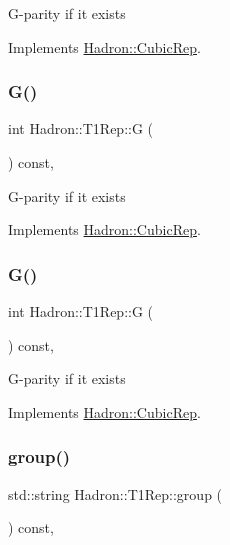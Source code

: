 G-\/parity if it exists 

Implements \mbox{\hyperlink{structHadron_1_1CubicRep_a52104e43266d1614c00bbd1c3b395458}{Hadron\+::\+Cubic\+Rep}}.

\mbox{\label{structHadron_1_1T1Rep_a824c17669ccaf2513c03a3b41a25108e}} 
\subsubsection{\texorpdfstring{G()}{G()}\hspace{0.1cm}{\footnotesize\ttfamily [2/3]}}
{\footnotesize\ttfamily int Hadron\+::\+T1\+Rep\+::G (\begin{DoxyParamCaption}{ }\end{DoxyParamCaption}) const\hspace{0.3cm}{\ttfamily [inline]}, {\ttfamily [virtual]}}

G-\/parity if it exists 

Implements \mbox{\hyperlink{structHadron_1_1CubicRep_a52104e43266d1614c00bbd1c3b395458}{Hadron\+::\+Cubic\+Rep}}.

\mbox{\label{structHadron_1_1T1Rep_a824c17669ccaf2513c03a3b41a25108e}} 
\subsubsection{\texorpdfstring{G()}{G()}\hspace{0.1cm}{\footnotesize\ttfamily [3/3]}}
{\footnotesize\ttfamily int Hadron\+::\+T1\+Rep\+::G (\begin{DoxyParamCaption}{ }\end{DoxyParamCaption}) const\hspace{0.3cm}{\ttfamily [inline]}, {\ttfamily [virtual]}}

G-\/parity if it exists 

Implements \mbox{\hyperlink{structHadron_1_1CubicRep_a52104e43266d1614c00bbd1c3b395458}{Hadron\+::\+Cubic\+Rep}}.

\mbox{\label{structHadron_1_1T1Rep_a92f0ff47781bd3fd98054295d9a42f3a}} 
\subsubsection{\texorpdfstring{group()}{group()}\hspace{0.1cm}{\footnotesize\ttfamily [1/3]}}
{\footnotesize\ttfamily std\+::string Hadron\+::\+T1\+Rep\+::group (\begin{DoxyParamCaption}{ }\end{DoxyParamCaption}) const\hspace{0.3cm}{\ttfamily [inline]}, {\ttfamily [virtual]}}

